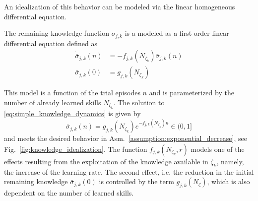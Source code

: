 An idealization of this behavior can be modeled via the linear homogeneous differential equation.
\begin{tcolorbox}
	\begin{definition}\label{assumption:ode_model}
		The remaining knowledge function $\bar{\sigma}_{j,k}$ is a modeled as a first order linear differential equation defined as
		\begin{subequations}\label{eq:simple_knowledge_dynamics}
			\begin{alignat}{2}
				\dot{\bar{\sigma}}_{j,k}\left(n\right) &= -f_{j,k} \left(N_{\zeta_k} \right) \bar{\sigma}_{j,k}\left(n\right)\\
				\bar{\sigma}_{j,k}(0) &= g_{j,k} \left(N_{\zeta_k}\right)
			\end{alignat}
		\end{subequations}
	\end{definition}
\end{tcolorbox} 
This model is a function of the trial episodes $n$ and is parameterized by the number of already learned skills $N_{\zeta_k}$. The solution to \eqref{eq:simple_knowledge_dynamics} is given by
\begin{equation}\label{eq:knowledge_exponential_form}
	\boxed{\bar{\sigma}_{j,k}(n) = g_{j,k}\left(N_{\zeta_k}\right) e ^{-f_{j,k}\left(N_{\zeta_k}\right) n} \in (0,1]}
\end{equation}
and meets the desired behavior in Asm.~\ref{assumption:exponential_decrease}, see Fig.~\ref{fig:knowledge_idealization}. The function $f_{j,k}\left(N_{\zeta_k}, r\right)$ models one of the effects resulting from the exploitation of the knowledge available in $\zeta_k$, namely, the increase of the learning rate. The second effect, i.e. the reduction in the initial remaining knowledge $\bar{\sigma}_{j,k}(0)$ is controlled by the term $g_{j,k}\left(N_{\zeta}\right)$, which is also dependent on the number of learned skills.
